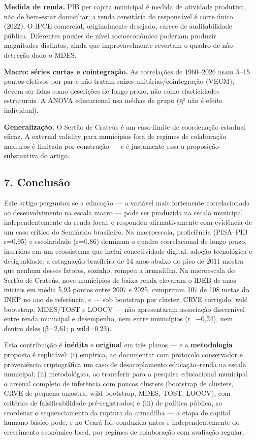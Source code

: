 \documentclass[
  brazilian,
  12pt,
  a4paper,
]{article}
\begin{document}
\textbf{Medida de renda.} PIB per capita municipal é medida de atividade
produtiva, não de bem-estar domiciliar; a renda censitária do
responsável é corte único (2022). O IPCE comercial, originalmente
desejado, carece de auditabilidade pública. Diferentes proxies de nível
socioeconômico poderiam produzir magnitudes distintas, ainda que
improvavelmente revertam o quadro de não-detecção dado o MDES.

\textbf{Macro: séries curtas e cointegração.} As correlações de
1960--2026 usam 5--15 pontos efetivos por par e não tratam raízes
unitárias/cointegração (VECM); devem ser lidas como descrições de longo
prazo, não como elasticidades estruturais. A ANOVA educacional usa
médias de grupo (η² não é efeito individual).

\textbf{Generalização.} O Sertão de Crateús é um caso-limite de
coordenação estadual eficaz. A external validity para municípios fora de
regimes de colaboração maduros é limitada por construção --- e é
justamente essa a proposição substantiva do artigo.

\subsection{7. Conclusão}\label{conclusuxe3o}

Este artigo perguntou se a educação --- a variável mais fortemente
correlacionada ao desenvolvimento na escala macro --- pode ser produzida
na escala municipal independentemente da renda local, e respondeu
afirmativamente com evidência de um caso crítico do Semiárido
brasileiro. Na macroescala, proficiência (PISA--PIB r=0,95) e
escolaridade (r=0,86) dominam o quadro correlacional de longo prazo,
inseridas em um ecossistema que inclui conectividade digital, adoção
tecnológica e desigualdade; a estagnação brasileira de 14 anos abaixo do
pico de 2011 mostra que nenhum desses fatores, sozinho, rompeu a
armadilha. Na microescala do Sertão de Crateús, nove municípios de baixa
renda elevaram o IDEB de anos iniciais em média 5,93 pontos entre 2007 e
2025, cumpriram 107 de 108 metas do INEP no ano de referência, e --- sob
bootstrap por cluster, CRVE corrigido, wild bootstrap, MDES/TOST e LOOCV
--- não apresentaram associação discernível entre renda municipal e
desempenho, nem entre municípios (r=−0,24), nem dentro deles (β=2,61; p
wild=0,23).

Esta contribuição é \textbf{inédita} e \textbf{original} em três planos
--- e a \textbf{metodologia} proposta é replicável: (i) empírica, ao
documentar com protocolo conservador e proveniência criptográfica um
caso de desacoplamento educação--renda na escala municipal; (ii)
metodológica, ao transferir para a pesquisa educacional municipal o
arsenal completo de inferência com poucos clusters (bootstrap de
clusters, CRVE de pequena amostra, wild bootstrap, MDES, TOST, LOOCV),
com critérios de falsificabilidade pré-registrados; e (iii) de política
pública, ao reordenar o sequenciamento da ruptura da armadilha --- a
etapa de capital humano básico pode, e no Ceará foi, conduzida antes e
independentemente do crescimento econômico local, por regimes de
colaboração com avaliação regular.
\end{document}
